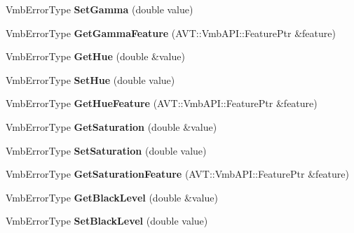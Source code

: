 \begin{DoxyCompactItemize}
\item 
\hypertarget{classMakoCamera_a0c180ad34814b5189c86dd6057e0f96e}{Vmb\-Error\-Type {\bfseries Set\-Gamma} (double value)}\label{classMakoCamera_a0c180ad34814b5189c86dd6057e0f96e}

\item 
\hypertarget{classMakoCamera_a02168d9b2b86993e0ac6f6a1e298f084}{Vmb\-Error\-Type {\bfseries Get\-Gamma\-Feature} (A\-V\-T\-::\-Vmb\-A\-P\-I\-::\-Feature\-Ptr \&feature)}\label{classMakoCamera_a02168d9b2b86993e0ac6f6a1e298f084}

\item 
\hypertarget{classMakoCamera_ae7e519798e2754a949810acda22ffcd6}{Vmb\-Error\-Type {\bfseries Get\-Hue} (double \&value)}\label{classMakoCamera_ae7e519798e2754a949810acda22ffcd6}

\item 
\hypertarget{classMakoCamera_af106faa285fb041a7c913c2d51dff3fa}{Vmb\-Error\-Type {\bfseries Set\-Hue} (double value)}\label{classMakoCamera_af106faa285fb041a7c913c2d51dff3fa}

\item 
\hypertarget{classMakoCamera_aedf847c7dc0caf6e3ef5253dd8d9bc82}{Vmb\-Error\-Type {\bfseries Get\-Hue\-Feature} (A\-V\-T\-::\-Vmb\-A\-P\-I\-::\-Feature\-Ptr \&feature)}\label{classMakoCamera_aedf847c7dc0caf6e3ef5253dd8d9bc82}

\item 
\hypertarget{classMakoCamera_a56d70947470fc0dbb6f38e77a9b498af}{Vmb\-Error\-Type {\bfseries Get\-Saturation} (double \&value)}\label{classMakoCamera_a56d70947470fc0dbb6f38e77a9b498af}

\item 
\hypertarget{classMakoCamera_ade4d15c0e8afe50ca2ff03948ee85406}{Vmb\-Error\-Type {\bfseries Set\-Saturation} (double value)}\label{classMakoCamera_ade4d15c0e8afe50ca2ff03948ee85406}

\item 
\hypertarget{classMakoCamera_ab7862f08f403de9b6bcccc13bd7b18c1}{Vmb\-Error\-Type {\bfseries Get\-Saturation\-Feature} (A\-V\-T\-::\-Vmb\-A\-P\-I\-::\-Feature\-Ptr \&feature)}\label{classMakoCamera_ab7862f08f403de9b6bcccc13bd7b18c1}

\item 
\hypertarget{classMakoCamera_a043b7e00b8a873d29a3efac913e33669}{Vmb\-Error\-Type {\bfseries Get\-Black\-Level} (double \&value)}\label{classMakoCamera_a043b7e00b8a873d29a3efac913e33669}

\item 
\hypertarget{classMakoCamera_ab92c22343a039adc77488c2078fb168b}{Vmb\-Error\-Type {\bfseries Set\-Black\-Level} (double value)}\label{classMakoCamera_ab92c22343a039adc77488c2078fb168b}


\end{DoxyCompactItemize}
